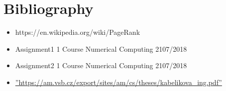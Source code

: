 \documentclass[12 pt]{article}
\begin{document}
\section{Bibliography}
\begin{itemize}
\item https://en.wikipedia.org/wiki/PageRank
\item Assignment1 1 Course Numerical Computing 2107/2018
\item Assignment2 1 Course Numerical Computing 2107/2018
\item \hyperref[label_name]{''https://am.vsb.cz/export/sites/am/cs/theses/kabelikova\_ing.pdf''}
\end{itemize}
\end{document}
